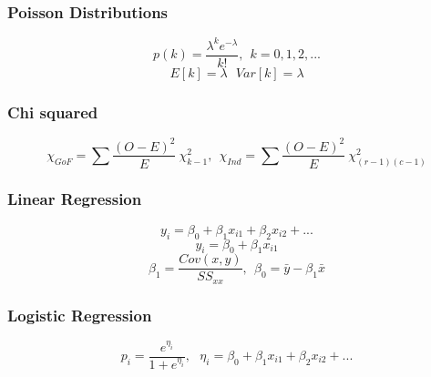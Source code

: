 \documentclass[a4paper,12pt]{article}
\theoremstyle{Qstyle}
\begin{document}
	\subsubsection*{Poisson Distributions}
	\[p(k)=\frac{\lambda^ke^{-\lambda}}{k!}, \ \ k=0,1,2,... \]
	\[E[k]=\lambda \ \ \ Var[k]=\lambda \]
	
	\subsubsection*{Chi squared}
	\[\chi_{GoF}=\sum \frac{(O-E)^2}{E} ~\chi^2_{k-1},\ \  \chi_{Ind}=\sum \frac{(O-E)^2}{E} ~\chi^2_{(r-1)(c-1)} \]
	
	\subsubsection*{Linear Regression}
	\[  y_i=\beta_0+\beta_1 x_{i1} +\beta_2 x_{i2}+... \]
	\[  y_i=\beta_0+\beta_1 x_{i1}\]
	\[  \beta_1 =\frac{Cov(x,y)}{SS_{xx}}, \ \  \beta_0 =\bar{y}-\beta_1\bar{x}\]
	
	\subsubsection*{Logistic Regression}
	\[  p_i=\frac{e^{\eta_i}}{1+e^{\eta_i}}, \ \ \ \eta_i=\beta_0+\beta_1 x_{i1} +\beta_2 x_{i2}+... \]
	
	
\end{document}

